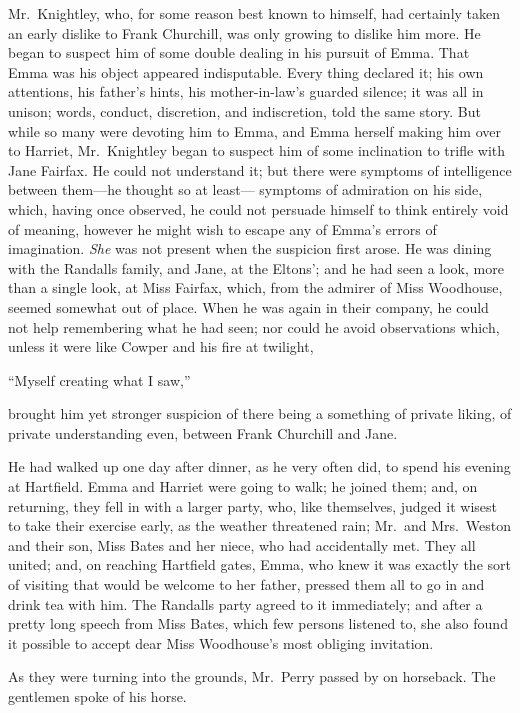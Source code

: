 Mr.\ Knightley, who, for some reason best known to himself, had certainly
taken an early dislike to Frank Churchill, was only growing to dislike
him more.  He began to suspect him of some double dealing in his
pursuit of Emma.  That Emma was his object appeared indisputable.
Every thing declared it; his own attentions, his father's hints,
his mother-in-law's guarded silence; it was all in unison;
words, conduct, discretion, and indiscretion, told the same story.
But while so many were devoting him to Emma, and Emma herself making him
over to Harriet, Mr.\ Knightley began to suspect him of some inclination
to trifle with Jane Fairfax.  He could not understand it; but there
were symptoms of intelligence between them---he thought so at least---%
symptoms of admiration on his side, which, having once observed,
he could not persuade himself to think entirely void of meaning,
however he might wish to escape any of Emma's errors of imagination.
\emph{She} was not present when the suspicion first arose.  He was dining
with the Randalls family, and Jane, at the Eltons'; and he had
seen a look, more than a single look, at Miss Fairfax, which,
from the admirer of Miss Woodhouse, seemed somewhat out of place.
When he was again in their company, he could not help remembering
what he had seen; nor could he avoid observations which, unless it
were like Cowper and his fire at twilight,

``Myself creating what I saw,''

brought him yet stronger suspicion of there being a something
of private liking, of private understanding even, between Frank
Churchill and Jane.

He had walked up one day after dinner, as he very often did,
to spend his evening at Hartfield.  Emma and Harriet were going
to walk; he joined them; and, on returning, they fell in with a
larger party, who, like themselves, judged it wisest to take their
exercise early, as the weather threatened rain; Mr.\ and Mrs.\ Weston
and their son, Miss Bates and her niece, who had accidentally met.
They all united; and, on reaching Hartfield gates, Emma, who knew it
was exactly the sort of visiting that would be welcome to her father,
pressed them all to go in and drink tea with him.  The Randalls
party agreed to it immediately; and after a pretty long speech
from Miss Bates, which few persons listened to, she also found it
possible to accept dear Miss Woodhouse's most obliging invitation.

As they were turning into the grounds, Mr.\ Perry passed by on horseback.
The gentlemen spoke of his horse.

